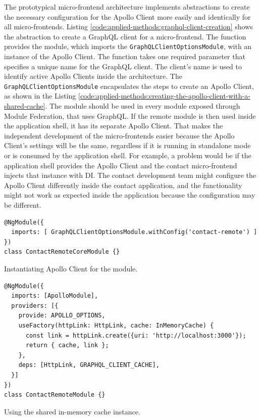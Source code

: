 \noindent The prototypical micro-frontend architecture implements abstractions to create the necessary configuration for the Apollo Client more easily and identically for all micro-frontends. Listing \ref{code:applied-methods:graphql-client-creation} shows the abstraction to create a GraphQL client for a micro-frontend. The function provides the module, which imports the \texttt{GraphQLClientOptionsModule}, with an instance of the Apollo Client. The function takes one required parameter that specifies a unique name for the GraphQL client. The client's name is used to identify active Apollo Clients inside the architecture. The \texttt{GraphQLClientOptionsModule} encapsulates the steps to create an Apollo Client, as shown in the Listing \ref{code:applied-methods:creating-the-apollo-client-with-a-shared-cache}. The module should be used in every module exposed through Module Federation, that uses GraphQL. If the remote module is then used inside the application shell, it has its separate Apollo Client. That makes the independent development of the micro-frontends easier because the Apollo Client's settings will be the same, regardless if it is running in standalone mode or is consumed by the application shell. For example, a problem would be if the application shell provides the Apollo Client and the contact micro-frontend injects that instance with \ac{DI}. The contact development team might configure the Apollo Client differently inside the contact application, and the functionality might not work as expected inside the application because the configuration may be different.

\ifshowListings
  \begin{listing}[H]
    \begin{verbatim}
@NgModule({
  imports: [ GraphQLClientOptionsModule.withConfig('contact-remote') ]
})
class ContactRemoteCoreModule {}
    \end{verbatim}
  \caption{Instantiating Apollo Client for the module.}\label{code:applied-methods:graphql-client-creation}
  \end{listing}
\fi

\ifshowListings
\begin{listing}[H]
\begin{verbatim}
@NgModule({
  imports: [ApolloModule],
  providers: [{
    provide: APOLLO_OPTIONS,
    useFactory(httpLink: HttpLink, cache: InMemoryCache) {
      const link = httpLink.create({uri: 'http://localhost:3000'});
      return { cache, link };
    },
    deps: [HttpLink, GRAPHQL_CLIENT_CACHE],
  }]
})
class ContactRemoteModule {}
\end{verbatim}
\caption{Using the shared in-memory cache instance.}\label{code:applied-methods:creating-the-apollo-client-with-a-shared-cache}
\end{listing}
\fi

